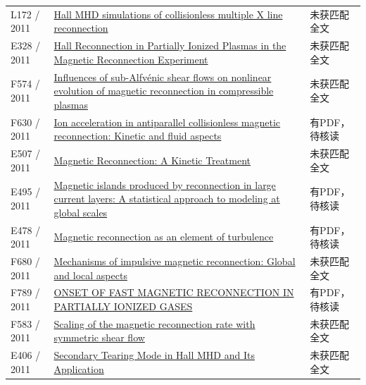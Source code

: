 \begin{longtable}{P{24mm}P{97mm}P{27mm}}
L172 / 2011 & \href{https://doi.org/10.1029/2010ja015992}{Hall MHD simulations of collisionless multiple X line reconnection} & 未获匹配全文\\

E328 / 2011 & \href{http://ui.adsabs.harvard.edu/abs/2012decs.confE...2L/abstract}{Hall Reconnection in Partially Ionized Plasmas in the Magnetic Reconnection Experiment} & 未获匹配全文\\

F574 / 2011 & \href{https://doi.org/10.1063/1.3643792}{Influences of sub-Alfvénic shear flows on nonlinear evolution of magnetic reconnection in compressible plasmas} & 未获匹配全文\\

F630 / 2011 & \href{https://doi.org/10.1016/j.crhy.2010.11.004}{Ion acceleration in antiparallel collisionless magnetic reconnection: Kinetic and fluid aspects} & 有PDF，待核读\\

E507 / 2011 & \href{https://doi.org/10.1029/gm090p0155}{Magnetic Reconnection: A Kinetic Treatment} & 未获匹配全文\\

E495 / 2011 & \href{http://hdl.handle.net/1903/12005}{Magnetic islands produced by reconnection in large current layers: A statistical approach to modeling at global scales} & 有PDF，待核读\\

E478 / 2011 & \href{https://doi.org/10.5194/npg-18-675-2011}{Magnetic reconnection as an element of turbulence} & 有PDF，待核读\\

F680 / 2011 & \href{https://doi.org/10.1063/1.3658034}{Mechanisms of impulsive magnetic reconnection: Global and local aspects} & 未获匹配全文\\

F789 / 2011 & \href{https://doi.org/10.1088/0004-637x/739/2/72}{ONSET OF FAST MAGNETIC RECONNECTION IN PARTIALLY IONIZED GASES} & 有PDF，待核读\\

F583 / 2011 & \href{https://doi.org/10.1063/1.3609771}{Scaling of the magnetic reconnection rate with symmetric shear flow} & 未获匹配全文\\

E406 / 2011 & \href{http://ui.adsabs.harvard.edu/abs/2011AGUFMSM23B2046M/abstract}{Secondary Tearing Mode in Hall MHD and Its Application} & 未获匹配全文\\


\end{longtable}
